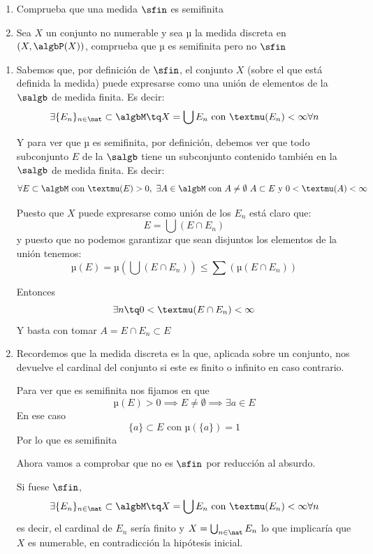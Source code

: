 \begin{problem}
\begin{enumerate}
\item Comprueba que una medida $\sfin$ es semifinita
\item Sea $X$ un conjunto no numerable y sea µ la medida discreta en $(X, \algbP (X))$, comprueba que µ es  semifinita pero no $\sfin$
\end{enumerate}

\solution
\begin{enumerate}
\item
Sabemos que, por definición de $\sfin$, el conjunto $X$ (sobre el que está definida la medida) puede expresarse como una unión de elementos de la $\salgb$ de medida finita. Es decir:
\[\exists \{E_n\}_{n \in \nat} \subset \algbM \tq X = \bigcup E_n \text{ con } µ(E_n)< \infty \forall n\]

Y para ver que µ es semifinita, por definición, debemos ver que todo subconjunto $E$ de la $\salgb$ tiene un subconjunto contenido también en la $\salgb$ de medida finita. Es decir:
\[\forall E \subset \algbM \text{ con } µ(E)>0, \ \exists A \in \algbM \text{ con } A\neq \emptyset \ A \subset E \text{ y } 0<µ(A) < \infty\]

Puesto que $X$ puede expresarse como unión de los $E_n$ está claro que:
\[E= \bigcup (E \cap E_n)\]
y puesto que no podemos garantizar que sean disjuntos los elementos de la unión tenemos:
\[µ(E)=µ(\bigcup (E \cap E_n))\leq \sum(µ(E \cap E_n))\]

Entonces
\[\exists n \tq 0<µ(E \cap E_n) < \infty\]
Y basta con tomar $A=E \cap E_n \subset E$

\item
Recordemos que la medida discreta es la que, aplicada sobre un conjunto, nos devuelve el cardinal del conjunto si este es finito o infinito en caso contrario.

Para ver que es semifinita nos fijamos en que
\[µ(E) > 0 \implies E \neq \emptyset \implies \exists a \in E\]
En ese caso
\[\{a\}\subset E \text{ con } µ(\{a\})=1\]
Por lo que es semifinita

Ahora vamos a comprobar que no es $\sfin$ por reducción al absurdo.

Si fuese $\sfin$,
\[\exists \{E_n\}_{n \in \nat} \subset \algbM \tq X = \bigcup E_n \text{ con } µ(E_n)< \infty \forall n\]
es decir, el cardinal de $E_n$ sería finito  y $X= \bigcup_{n \in \nat }E_n$ lo que implicaría que $X$ es numerable, en contradicción la hipótesis inicial.

\end{enumerate}
\end{problem}

